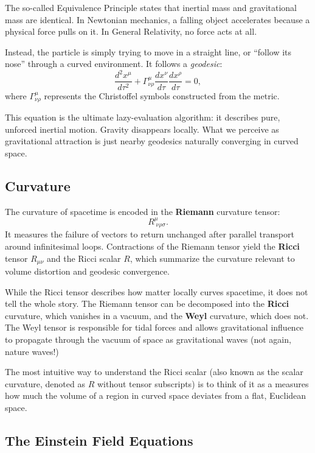 The so-called Equivalence Principle states that inertial mass and gravitational mass are identical.
In Newtonian mechanics, a falling object accelerates because a physical force pulls on it.
In General Relativity, no force acts at all. 

Instead, the particle is simply trying to move in a straight line, or ``follow its nose'' through a curved environment.
It follows a \emph{geodesic}:
\begin{equation}
\frac{d^2 x^\mu}{d\tau^2} + \Gamma^\mu_{\nu\rho} \frac{dx^\nu}{d\tau} \frac{dx^\rho}{d\tau} = 0,
\end{equation}
where $\Gamma^\mu_{\nu\rho}$ represents the Christoffel symbols constructed from the metric. 

This equation is the ultimate lazy-evaluation algorithm: it describes pure, unforced inertial motion.
Gravity disappears locally. What we perceive as gravitational attraction is just nearby geodesics naturally converging in curved space.

\subsection*{Curvature}


The curvature of spacetime is encoded in the \textbf{Riemann} curvature tensor:
\begin{equation}
R^\mu_{\;\nu\rho\sigma}.
\end{equation}
It measures the failure of vectors to return unchanged after parallel transport around infinitesimal loops.
Contractions of the Riemann tensor yield the \textbf{Ricci} tensor $R_{\mu\nu}$ and the Ricci scalar $R$, which summarize the curvature relevant to volume distortion and geodesic convergence.

While the Ricci tensor describes how matter locally curves spacetime, it does not tell the whole story.
The Riemann tensor can be decomposed into the \textbf{Ricci} curvature, which vanishes in a vacuum, and the \textbf{Weyl} curvature, which does not.
The Weyl tensor is responsible for tidal forces and allows gravitational influence to propagate through the vacuum of space as gravitational waves (not again, nature waves!)

The most intuitive way to understand the Ricci scalar (also known as the scalar curvature, denoted as $R$ without tensor subscripts) is to think of it as a measures how much the volume of a region in curved space deviates from a flat, Euclidean space.


\subsection*{The Einstein Field Equations}

